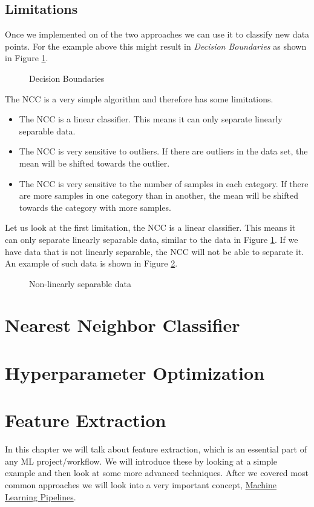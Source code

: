 \documentclass[a4paper]{article}
\begin{document}
\subsection{Limitations}
Once we implemented on of the two approaches we can use it to classify new data points. For the example above this might result in \textit{Decision Boundaries} as shown in Figure \ref{fig:ncc_db_0}.
\begin{figure}[h]
  \centering
  
  \caption{Decision Boundaries}
  \label{fig:ncc_db_0}
\end{figure}

The NCC is a very simple algorithm and therefore has some limitations.
\begin{itemize}
  \item The NCC is a linear classifier. This means it can only separate linearly separable data.
  \item The NCC is very sensitive to outliers. If there are outliers in the data set, the mean will be shifted towards the outlier.
  \item The NCC is very sensitive to the number of samples in each category. If there are more samples in one category than in another, the mean will be shifted towards the category with more samples.
\end{itemize}

Let us look at the first limitation, the NCC is a linear classifier. This means it can only separate linearly separable data, similar to the data in Figure \ref{fig:ncc_db_0}.
If we have data that is not linearly separable, the NCC will not be able to separate it. An example of such data is shown in Figure \ref{fig:ncc_db_1}.

\begin{figure}[h]
  \centering
  
  \caption{Non-linearly separable data}
  \label{fig:ncc_db_1}
\end{figure}
\newpage

\section{Nearest Neighbor Classifier}
\section{Hyperparameter Optimization}
\newpage
\section{Feature Extraction}
In this chapter we will talk about feature extraction, which is an essential part of any ML project/workflow.
We will introduce these by looking at a simple example and then look at some more advanced techniques.
After we covered most common approaches we will look into a very important concept, \underline{Machine Learning Pipelines}.
\end{document}
